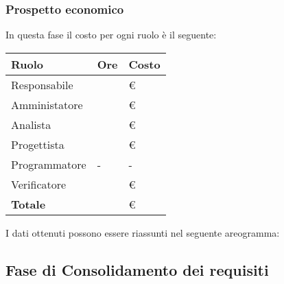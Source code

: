 \subsubsection{Prospetto economico}
In questa fase il costo per ogni ruolo è il seguente:

\begin{center}
	\begin{longtable}{|p{}|p{}|p{}|}
		\hline
		\rowcolor{lighter-grayer}
		\centering\textbf{Ruolo} & \centering\textbf{Ore} & \textbf{Costo} \\
		\hline
		\endfirsthead
		
		\centering Responsabile & \centering & \euro\\
		\hline
		\centering Amministatore & \centering & \euro\\
		\hline
		\centering Analista & \centering & \euro\\
		\hline
		\centering Progettista & \centering & \euro\\
		\hline
		\centering Programmatore & \centering - & - \\
		\hline
		\centering Verificatore & \centering & \euro\\
		\hline
		\centering\textbf{Totale} & \centering & \euro\\
		\hline
	\end{longtable}
\end{center}
I dati ottenuti possono essere riassunti nel seguente areogramma:
	
\subsection{Fase di Consolidamento dei requisiti}
